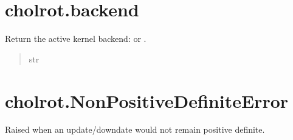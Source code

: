 \documentclass[a4paper,11pt,english]{sphinxmanual}
\begin{document}
\sphinxstepscope


\section{cholrot.backend}
\label{\detokenize{generated/cholrot.backend:cholrot-backend}}\label{\detokenize{generated/cholrot.backend::doc}}

\begin{fulllineitems}
\label{\detokenize{generated/cholrot.backend:cholrot.backend}}
\pysigstartsignatures
\pysiglinewithargsret
{}
{}
{}
\pysigstopsignatures
\sphinxAtStartPar
Return the active kernel backend:  or .
\begin{quote}\begin{description}
\sphinxAtStartPar
str

\end{description}\end{quote}

\end{fulllineitems}


\sphinxstepscope


\section{cholrot.NonPositiveDefiniteError}
\label{\detokenize{generated/cholrot.NonPositiveDefiniteError:cholrot-nonpositivedefiniteerror}}\label{\detokenize{generated/cholrot.NonPositiveDefiniteError::doc}}

\begin{fulllineitems}
\label{\detokenize{generated/cholrot.NonPositiveDefiniteError:cholrot.NonPositiveDefiniteError}}
\pysigstartsignatures
\pysigline
{}
\pysigstopsignatures
\sphinxAtStartPar
Raised when an update/downdate would not remain positive definite.

\end{fulllineitems}


\sphinxstepscope
\end{document}
